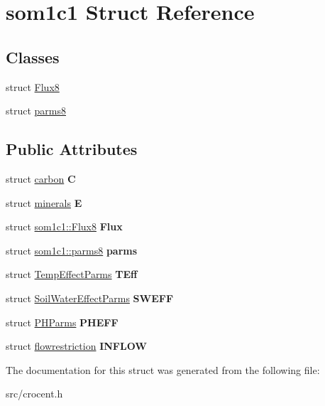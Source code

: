\hypertarget{structsom1c1}{\section{som1c1 Struct Reference}
\label{structsom1c1}
}
\subsection*{Classes}
\begin{DoxyCompactItemize}
\item 
struct \hyperlink{structsom1c1_1_1_flux8}{Flux8}
\item 
struct \hyperlink{structsom1c1_1_1parms8}{parms8}
\end{DoxyCompactItemize}
\subsection*{Public Attributes}
\begin{DoxyCompactItemize}
\item 
\hypertarget{structsom1c1_a8b049f775f9521e4f5ac404c79b74c48}{struct \hyperlink{structcarbon}{carbon} {\bfseries C}}\label{structsom1c1_a8b049f775f9521e4f5ac404c79b74c48}

\item 
\hypertarget{structsom1c1_a8273a32f3582729cac6d36782162ce9b}{struct \hyperlink{structminerals}{minerals} {\bfseries E}}\label{structsom1c1_a8273a32f3582729cac6d36782162ce9b}

\item 
\hypertarget{structsom1c1_a72b76a0a5623603d20035867d306a4c2}{struct \hyperlink{structsom1c1_1_1_flux8}{som1c1\-::\-Flux8} {\bfseries Flux}}\label{structsom1c1_a72b76a0a5623603d20035867d306a4c2}

\item 
\hypertarget{structsom1c1_af33ec83c64f381f0591980f017d5a21b}{struct \hyperlink{structsom1c1_1_1parms8}{som1c1\-::parms8} {\bfseries parms}}\label{structsom1c1_af33ec83c64f381f0591980f017d5a21b}

\item 
\hypertarget{structsom1c1_af5c27699015d288a7dda7f8cd96804be}{struct \hyperlink{struct_temp_effect_parms}{Temp\-Effect\-Parms} {\bfseries T\-Eff}}\label{structsom1c1_af5c27699015d288a7dda7f8cd96804be}

\item 
\hypertarget{structsom1c1_abd61fa83123e2937f3105377dcf785e6}{struct \hyperlink{struct_soil_water_effect_parms}{Soil\-Water\-Effect\-Parms} {\bfseries S\-W\-E\-F\-F}}\label{structsom1c1_abd61fa83123e2937f3105377dcf785e6}

\item 
\hypertarget{structsom1c1_a3b99b6844baee59d00b2374c9a251956}{struct \hyperlink{struct_p_h_parms}{P\-H\-Parms} {\bfseries P\-H\-E\-F\-F}}\label{structsom1c1_a3b99b6844baee59d00b2374c9a251956}

\item 
\hypertarget{structsom1c1_a794d3bb59491e6ce1f29e4f42cbd36e4}{struct \hyperlink{structflowrestriction}{flowrestriction} {\bfseries I\-N\-F\-L\-O\-W}}\label{structsom1c1_a794d3bb59491e6ce1f29e4f42cbd36e4}

\end{DoxyCompactItemize}


The documentation for this struct was generated from the following file\-:\begin{DoxyCompactItemize}
\item 
src/crocent.\-h\end{DoxyCompactItemize}
